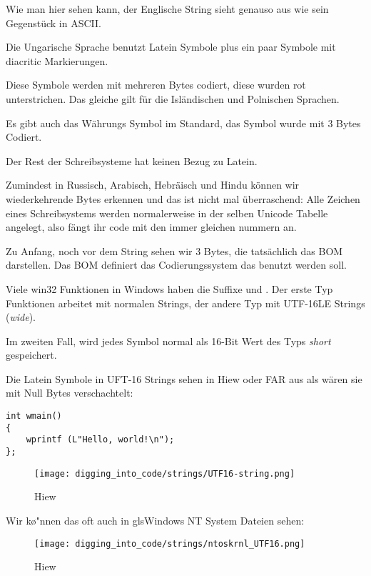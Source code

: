 Wie man hier sehen kann, der Englische String sieht genauso aus wie sein Gegenst\"uck in ASCII.

Die Ungarische Sprache benutzt Latein Symbole plus ein paar Symbole mit diacritic Markierungen.

Diese Symbole werden mit mehreren Bytes codiert, diese wurden rot unterstrichen.
Das gleiche gilt f\"ur die Isl\"andischen und Polnischen Sprachen.

Es gibt auch das  W\"ahrungs Symbol im Standard, das Symbol wurde mit 3 Bytes Codiert.

Der Rest der Schreibsysteme hat keinen Bezug zu Latein.

Zumindest in Russisch, Arabisch, Hebr\"aisch und Hindu k\"onnen wir wiederkehrende Bytes erkennen und das ist nicht mal \"uberraschend:
Alle Zeichen eines Schreibsystems werden normalerweise in der selben Unicode Tabelle angelegt, also f\"angt ihr code mit den 
immer gleichen nummern an. %

Zu Anfang, noch vor dem  String sehen wir 3 Bytes, die tats\"achlich das \ac{BOM} darstellen.
Das \ac{BOM} definiert das Codierungssystem das benutzt werden soll.


Viele win32 Funktionen in Windows haben die Suffixe  und . 
Der erste Typ Funktionen arbeitet mit normalen Strings, der andere Typ mit 
UTF-16LE Strings (\emph{wide}). 

Im zweiten Fall, wird jedes Symbol normal als 16-Bit Wert des Typs \emph{short} gespeichert.

Die Latein Symbole in UFT-16 Strings sehen in Hiew oder FAR aus als w\"aren sie mit Null Bytes verschachtelt:

\begin{lstlisting}[style=customc]
int wmain()
{
	wprintf (L"Hello, world!\n");
};
\end{lstlisting}

\begin{figure}[H]
\centering
\texttt{[image: digging\_into\_code/strings/UTF16-string.png]}
\caption{Hiew}
\end{figure}

Wir k\o"nnen das oft auch in gls{Windows NT} System Dateien sehen:

\begin{figure}[H]
\centering
\texttt{[image: digging\_into\_code/strings/ntoskrnl\_UTF16.png]}
\caption{Hiew}
\end{figure}

